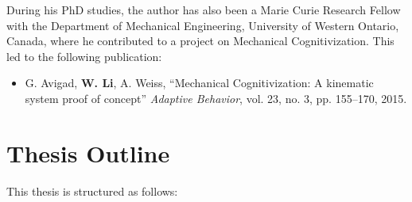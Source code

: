 During his PhD studies, the author has also been a Marie Curie Research Fellow with the Department of Mechanical Engineering, University of Western Ontario, Canada, where he contributed to a project on Mechanical Cognitivization. This led to the following publication:

\begin{itemize}
%
\item G. Avigad, \textbf{W. Li}, A. Weiss, ``Mechanical Cognitivization: A kinematic system proof of concept'' \textit{Adaptive Behavior}, vol. 23, no. 3, pp. 155--170, 2015.
%
\end{itemize}

\section{Thesis Outline}

This thesis is structured as follows:

